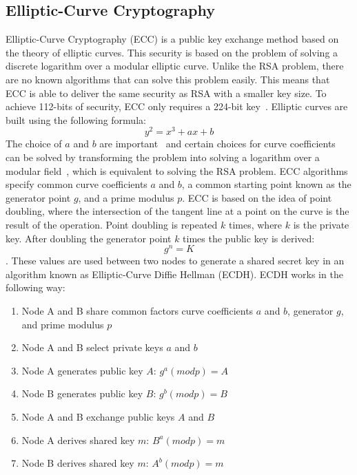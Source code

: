 \documentclass[journal]{IEEEtran}
\begin{document}
\subsection{Elliptic-Curve Cryptography}
Elliptic-Curve Cryptography (ECC) is a public key exchange method based on the theory of elliptic curves. This security is based on the problem of solving a discrete logarithm over a modular elliptic curve. Unlike the RSA problem, there are no known algorithms that can solve this problem easily. This means that ECC is able to deliver the same security as RSA with a smaller key size. To achieve 112-bits of security, ECC only requires a 224-bit key~\cite{PK2}. Elliptic curves are built using the following formula:
\[ y^2 = x^3 + ax + b \]
The choice of $a$ and $b$ are important~\cite{ECC1} and certain choices for curve coefficients can be solved by transforming the problem into solving a logarithm over a modular field~\cite{ECC3}, which is equivalent to solving the RSA problem. ECC algorithms specify common curve coefficients $a$ and $b$, a common starting point known as the generator point $g$, and a prime modulus $p$. ECC is based on the idea of point doubling, where the intersection of the tangent line at a point on the curve is the result of the operation. Point doubling is repeated $k$ times, where $k$ is the private key. After doubling the generator point $k$ times the public key is derived:
\[g^n = K\].
These values are used between two nodes to generate a shared secret key in an algorithm known as Elliptic-Curve Diffie Hellman (ECDH). ECDH works in the following way:
\begin{enumerate}
        \item Node A and B share common factors curve coefficients $a$ and $b$, generator $g$, and prime modulus $p$
        \item Node A and B select private keys $a$ and $b$
        \item Node A generates public key $A$: $g^a(modp) = A$
        \item Node B generates public key $B$: $g^b(modp) = B$
        \item Node A and B exchange public keys $A$ and $B$
        \item Node A derives shared key $m$: $B^a(modp) = m$
        \item Node B derives shared key $m$: $A^b(modp) = m$
\end{enumerate}
\end{document}
